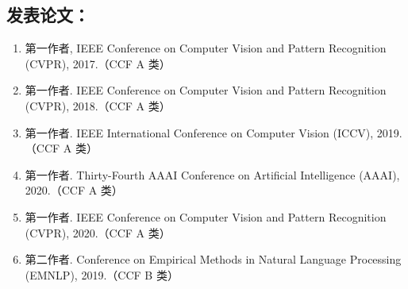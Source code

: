 \begin{publications}



 

\section*{发表论文：}

\begin{enumerate}
\item{
第一作者, IEEE Conference on Computer Vision and Pattern Recognition (CVPR), 2017.（CCF A 类）
}

\item{
第一作者. IEEE Conference on Computer Vision and Pattern Recognition (CVPR), 2018.（CCF A 类）
}

\item{
第一作者. IEEE International Conference on Computer Vision (ICCV), 2019.（CCF A 类）
}

\item{
第一作者. Thirty-Fourth AAAI Conference on Artificial Intelligence (AAAI), 2020.（CCF A 类）
}

\item{
第一作者. IEEE Conference on Computer Vision and Pattern Recognition (CVPR), 2020.（CCF A 类）
}

\item{
第二作者. Conference on Empirical Methods in Natural Language Processing (EMNLP), 2019.（CCF B 类）
}


\end{enumerate}
\end{publications}
